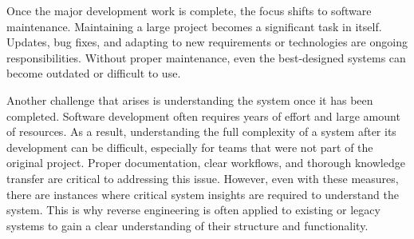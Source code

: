Once the major development work is complete, the focus shifts to software maintenance. Maintaining a large project becomes a significant task in itself. Updates, bug fixes, and adapting to new requirements or technologies are ongoing responsibilities. Without proper maintenance, even the best-designed systems can become outdated or difficult to use.

Another challenge that arises is understanding the system once it has been completed. Software development often requires years of effort and large amount of resources. As a result, understanding the full complexity of a system after its development can be difficult, especially for teams that were not part of the original project. Proper documentation, clear workflows, and thorough knowledge transfer are critical to addressing this issue. However, even with these measures, there are instances where critical system insights are required to understand the system. This is why reverse engineering is often applied to existing or legacy systems to gain a clear understanding of their structure and functionality.
